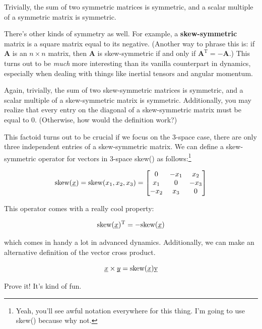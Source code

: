 \documentclass{report}
\begin{document}
\begin{onehalfspacing}
\begin{flushleft}
\medskip

Trivially, the sum of two symmetric matrices is symmetric, and a scalar multiple of a symmetric matrix is symmetric.

\medskip

There's other kinds of symmetry as well. For example, a \textbf{skew-symmetric} matrix is a square matrix equal to its negative. (Another way to phrase this is: if \textbf{A} is an \(n\times n\) matrix, then \textbf{A} is skew-symmetric if and only if \(\textbf{A}^\text{T} = -\textbf{A}\).) This turns out to be \textit{much} more interesting than its vanilla counterpart in dynamics, especially when dealing with things like inertial tensors and angular momentum.

\medskip

Again, trivially, the sum of two skew-symmetric matrices is symmetric, and a scalar multiple of a skew-symmetric matrix is symmetric. Additionally, you may realize that every entry on the diagonal of a skew-symmetric matrix must be equal to 0. (Otherwise, how would the definition work?) 

\medskip

This factoid turns out to be crucial if we focus on the 3-space case, there are only three independent entries of a skew-symmetric matrix. We can define a skew-symmetric operator for vectors in 3-space skew() as follows:\footnote{Yeah, you'll see awful notation everywhere for this thing. I'm going to use skew() because why not.}

\vspace{-0.1in}
\[\text{skew}(\underbar{\(x\)}) = \text{skew}(x_1, x_2, x_3) = \begin{bmatrix} 0 & -x_1 & x_2 \\ x_1 & 0 & -x_3 \\ -x_2 & x_3 & 0\end{bmatrix} \]

This operator comes with a really cool property:

\vspace{-0.1in}
\[\text{skew}(\underbar{\(x\)})^\text{T} = -\text{skew}(\underbar{\(x\)})\]

which comes in handy a lot in advanced dynamics. Additionally, we can make an alternative definition of the vector cross product.

\vspace{-0.1in}
\[\underbar{\(x\)} \times \underbar{\(y\)} = \text{skew}(\underbar{\(x\)}) \underbar{y}\]

Prove it! It's kind of fun.


\end{flushleft}
\end{onehalfspacing}
\end{document}
